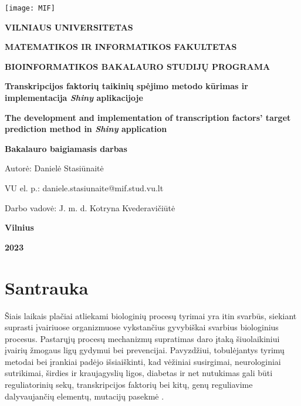 \documentclass[12pt]{article}
\begin{document}

\begin{titlepage}
\vskip 20pt
\begin{center}
\texttt{[image: MIF]}
\end{center}


\vskip 20pt
\centerline{\bf \large \textbf{VILNIAUS UNIVERSITETAS}}
\bigskip
\centerline{\large \textbf{MATEMATIKOS IR INFORMATIKOS FAKULTETAS}}
\bigskip
\centerline{\large \textbf{BIOINFORMATIKOS BAKALAURO STUDIJŲ PROGRAMA}}



\vskip 90pt
\begin{center}
    {\bf \LARGE Transkripcijos faktorių taikinių spėjimo metodo kūrimas ir
    implementacija \emph{Shiny} aplikacijoje}
\end{center}
\begin{center}
    {\bf \Large The development and implementation of transcription factors'
    target prediction method in \emph{Shiny} application}
\end{center}
\vskip 20pt
\centerline{\bf \large \textbf{Bakalauro baigiamasis darbas}}
\bigskip
\vskip 40pt

\hskip 140pt {\large Autorė: Danielė Stasiūnaitė}

\hskip 140pt{\large VU el. p.: daniele.stasiunaite@mif.stud.vu.lt}
\bigskip
\vskip 20pt

\hskip 140pt {\large Darbo vadovė: J. m. d. Kotryna Kvederavičiūtė}
\vskip 60pt
\vskip 40pt
\centerline{\large \textbf{Vilnius}}
\centerline{\large \textbf{2023}}
\newpage
\end{titlepage}



\tableofcontents
\newpage


\section*{Santrauka}
Šiais laikais plačiai atliekami biologinių procesų tyrimai yra itin svarbūs,
siekiant suprasti įvairiuose organizmuose vykstančius gyvybiškai svarbius
biologinius procesus. Pastarųjų
procesų mechanizmų supratimas daro įtaką šiuolaikiniui įvairių žmogaus ligų
gydymui bei prevencijai. Pavyzdžiui, tobulėjantys tyrimų metodai bei įrankiai
padėjo išsiaiškinti, kad vėžiniai susirgimai, neurologiniai sutrikimai, širdies
ir kraujagyslių ligos, diabetas ir net nutukimas gali būti reguliatorinių sekų, 
transkripcijos faktorių bei kitų, genų reguliavime dalyvaujančių elementų,
mutacijų pasekmė  \cite{ARTICLE0}.
\end{document}
